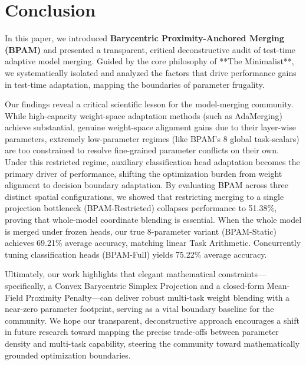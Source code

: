 \section{Conclusion}
\label{sec:conclusion}

In this paper, we introduced {\bf Barycentric Proximity-Anchored Merging (BPAM)} and presented a transparent, critical deconstructive audit of test-time adaptive model merging. Guided by the core philosophy of **The Minimalist**, we systematically isolated and analyzed the factors that drive performance gains in test-time adaptation, mapping the boundaries of parameter frugality.

Our findings reveal a critical scientific lesson for the model-merging community. While high-capacity weight-space adaptation methods (such as AdaMerging) achieve substantial, genuine weight-space alignment gains due to their layer-wise parameters, extremely low-parameter regimes (like BPAM's 8 global task-scalars) are too constrained to resolve fine-grained parameter conflicts on their own. Under this restricted regime, auxiliary classification head adaptation becomes the primary driver of performance, shifting the optimization burden from weight alignment to decision boundary adaptation. By evaluating BPAM across three distinct spatial configurations, we showed that restricting merging to a single projection bottleneck (BPAM-Restricted) collapses performance to 51.38\%, proving that whole-model coordinate blending is essential. When the whole model is merged under frozen heads, our true 8-parameter variant (BPAM-Static) achieves 69.21\% average accuracy, matching linear Task Arithmetic. Concurrently tuning classification heads (BPAM-Full) yields 75.22\% average accuracy.

Ultimately, our work highlights that elegant mathematical constraints—specifically, a Convex Barycentric Simplex Projection and a closed-form Mean-Field Proximity Penalty—can deliver robust multi-task weight blending with a near-zero parameter footprint, serving as a vital boundary baseline for the community. We hope our transparent, deconstructive approach encourages a shift in future research toward mapping the precise trade-offs between parameter density and multi-task capability, steering the community toward mathematically grounded optimization boundaries.
